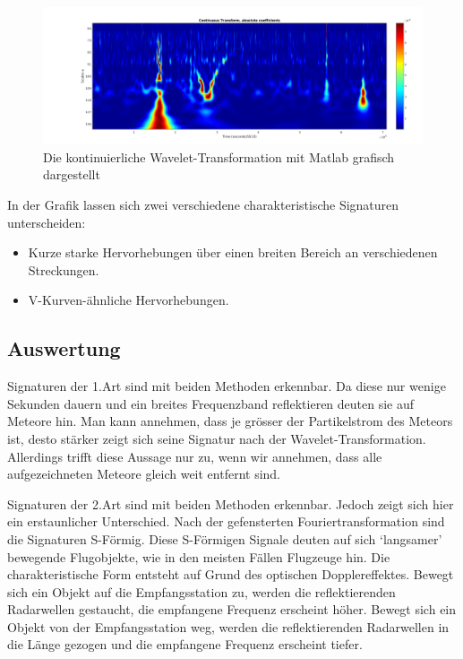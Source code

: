 \begin{refsection}
\begin{figure}[h!]
	\centering
	\includegraphics[width=\linewidth]{papers/meteor/images/signal_wscalo.png}
	\caption{Die kontinuierliche Wavelet-Transformation mit Matlab grafisch dargestellt}
	\label{fig:signalmitwscalo}
\end{figure}
In der Grafik lassen sich zwei verschiedene charakteristische Signaturen unterscheiden:
\begin{itemize}
	\item Kurze starke Hervorhebungen über einen breiten Bereich an verschiedenen Streckungen.
	\item V-Kurven-ähnliche  Hervorhebungen.
\end{itemize}

\newpage
\subsection{Auswertung}
Signaturen der 1.Art sind mit beiden Methoden erkennbar.
Da diese nur wenige Sekunden dauern und ein breites Frequenzband reflektieren deuten sie auf Meteore hin.
Man kann annehmen, dass je grösser der Partikelstrom des Meteors ist, desto stärker zeigt sich seine Signatur nach der Wavelet-Transformation.
Allerdings trifft diese Aussage nur zu, wenn wir annehmen, dass alle aufgezeichneten Meteore gleich weit entfernt sind.

Signaturen der 2.Art sind mit beiden Methoden erkennbar.
Jedoch zeigt sich hier ein erstaunlicher Unterschied.
Nach der gefensterten Fouriertransformation sind die Signaturen S-Förmig.
Diese S-Förmigen Signale deuten auf sich `langsamer' bewegende Flugobjekte, wie in den meisten Fällen Flugzeuge hin.
Die charakteristische Form entsteht auf Grund des optischen Dopplereffektes. 
Bewegt sich ein Objekt auf die Empfangsstation zu, werden die reflektierenden Radarwellen gestaucht, die empfangene Frequenz erscheint höher.
Bewegt sich ein Objekt von der Empfangsstation weg, werden die reflektierenden Radarwellen in die Länge gezogen und die empfangene Frequenz erscheint tiefer.


\end{refsection}
